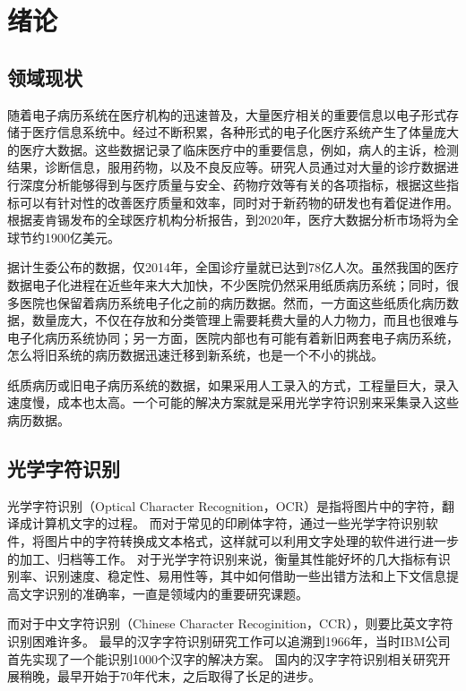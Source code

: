 ﻿\chapter{绪论}
\label{chap:introduction}

\section{领域现状}
随着电子病历系统在医疗机构的迅速普及，大量医疗相关的重要信息以电子形式存储于医疗信息系统中。经过不断积累，各种形式的电子化医疗系统产生了体量庞大的医疗大数据。这些数据记录了临床医疗中的重要信息，例如，病人的主诉，检测结果，诊断信息，服用药物，以及不良反应等。研究人员通过对大量的诊疗数据进行深度分析能够得到与医疗质量与安全、药物疗效等有关的各项指标，根据这些指标可以有针对性的改善医疗质量和效率，同时对于新药物的研发也有着促进作用。根据麦肯锡发布的全球医疗机构分析报告，到2020年，医疗大数据分析市场将为全球节约1900亿美元。

据计生委公布的数据，仅2014年，全国诊疗量就已达到78亿人次。虽然我国的医疗数据电子化进程在近些年来大大加快，不少医院仍然采用纸质病历系统；同时，很多医院也保留着病历系统电子化之前的病历数据。然而，一方面这些纸质化病历数据，数量庞大，不仅在存放和分类管理上需要耗费大量的人力物力，而且也很难与电子化病历系统协同；另一方面，医院内部也有可能有着新旧两套电子病历系统，怎么将旧系统的病历数据迅速迁移到新系统，也是一个不小的挑战。

纸质病历或旧电子病历系统的数据，如果采用人工录入的方式，工程量巨大，录入速度慢，成本也太高。一个可能的解决方案就是采用光学字符识别来采集录入这些病历数据。

\section{光学字符识别}
光学字符识别（Optical Character Recognition，OCR）是指将图片中的字符，翻译成计算机文字的过程\citep{mori1992historical}。
而对于常见的印刷体字符，通过一些光学字符识别软件，将图片中的字符转换成文本格式，这样就可以利用文字处理的软件进行进一步的加工、归档等工作。
对于光学字符识别来说，衡量其性能好坏的几大指标有识别率、识别速度、稳定性、易用性等，其中如何借助一些出错方法和上下文信息提高文字识别的准确率，一直是领域内的重要研究课题。

而对于中文字符识别（Chinese Character Recoginition，CCR），则要比英文字符识别困难许多。
最早的汉字字符识别研究工作可以追溯到1966年，当时IBM公司首先实现了一个能识别1000个汉字的解决方案。
国内的汉字字符识别相关研究开展稍晚，最早开始于70年代末\citep{trier1996feature}，之后取得了长足的进步\citep{FanxiaGuo,LongDing}。


